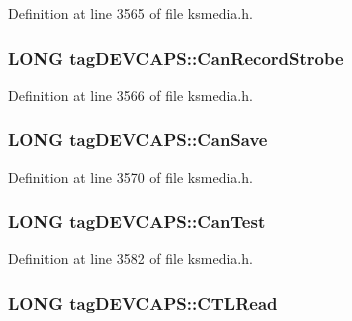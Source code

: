 Definition at line 3565 of file ksmedia.\+h.

\subsubsection[{\texorpdfstring{Can\+Record\+Strobe}{CanRecordStrobe}}]{\setlength{\rightskip}{0pt plus 5cm}L\+O\+NG tag\+D\+E\+V\+C\+A\+P\+S\+::\+Can\+Record\+Strobe}\hypertarget{structtag_d_e_v_c_a_p_s_ac972c6daa5ae199e11bcecca27f79ea2}{}\label{structtag_d_e_v_c_a_p_s_ac972c6daa5ae199e11bcecca27f79ea2}


Definition at line 3566 of file ksmedia.\+h.

\subsubsection[{\texorpdfstring{Can\+Save}{CanSave}}]{\setlength{\rightskip}{0pt plus 5cm}L\+O\+NG tag\+D\+E\+V\+C\+A\+P\+S\+::\+Can\+Save}\hypertarget{structtag_d_e_v_c_a_p_s_a22781df9f7b897007d3a7b596118fc7a}{}\label{structtag_d_e_v_c_a_p_s_a22781df9f7b897007d3a7b596118fc7a}


Definition at line 3570 of file ksmedia.\+h.

\subsubsection[{\texorpdfstring{Can\+Test}{CanTest}}]{\setlength{\rightskip}{0pt plus 5cm}L\+O\+NG tag\+D\+E\+V\+C\+A\+P\+S\+::\+Can\+Test}\hypertarget{structtag_d_e_v_c_a_p_s_aab9a87be6528e39e4c0e4cbafc9adaba}{}\label{structtag_d_e_v_c_a_p_s_aab9a87be6528e39e4c0e4cbafc9adaba}


Definition at line 3582 of file ksmedia.\+h.

\subsubsection[{\texorpdfstring{C\+T\+L\+Read}{CTLRead}}]{\setlength{\rightskip}{0pt plus 5cm}L\+O\+NG tag\+D\+E\+V\+C\+A\+P\+S\+::\+C\+T\+L\+Read}\hypertarget{structtag_d_e_v_c_a_p_s_ae7c766b2341e4367cafe9a6a2a4a4d7e}{}\label{structtag_d_e_v_c_a_p_s_ae7c766b2341e4367cafe9a6a2a4a4d7e}


